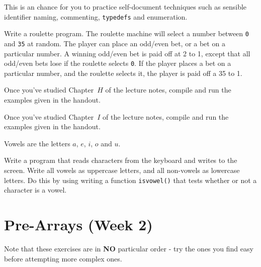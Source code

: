 This is an chance for you to practice self-document techniques such as
sensible identifier naming, commenting, \verb^typedefs^ and enumeration. 
\begin{exercise}
Write a roulette program. The roulette machine will select
a number between \verb^0^ and \verb^35^ at random. The player
can place an odd/even bet, or a bet on a particular number.
A winning odd/even bet is paid off at 2 to 1, except
that all odd/even bets lose if the roulette selects \verb^0^.
If the player places a bet on a particular number, and the
roulette selects it, the player is paid off a 35 to 1.
\end{exercise}


\begin{exercise}
Once you've studied Chapter~$H$ of the lecture notes, 
compile and run the examples given in the handout.
\end{exercise}








\begin{exercise}
Once you've studied Chapter~$I$ of the lecture notes, compile and run
the examples given in the handout.
\end{exercise}

Vowels are the letters $a$, $e$, $i$, $o$ and $u$.
\begin{exercise}
Write a program that reads characters from the keyboard and writes to the
screen. Write all vowels as uppercase letters, and all non-vowels as
lowercase letters. Do this by using writing a function \verb^isvowel()^
that tests whether or not a character is a vowel.
\end{exercise}

\chapter{Pre-Arrays (Week 2)}

Note that these exercises are  in {\bf NO} particular order - try the ones you find easy before attempting more complex ones.













